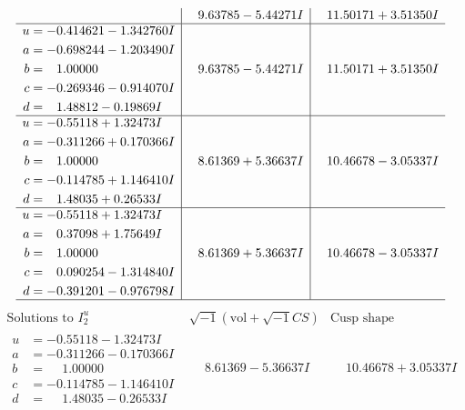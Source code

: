 \documentclass[1p]{elsarticle_modified}
\theoremstyle{definition}
\newcommand{\I}{\sqrt{-1}}
\begin{document}
$$\begin{array}{c|c|c}
 & \phantom{-}9.63785 - 5.44271 I & \phantom{-}11.50171 + 3.51350 I \\ \hline\begin{aligned}
u &= -0.414621 - 1.342760 I \\
a &= -0.698244 - 1.203490 I \\
b &= \phantom{-}1.00000\phantom{ +0.000000I} \\
c &= -0.269346 - 0.914070 I \\
d &= \phantom{-}1.48812 - 0.19869 I\end{aligned}
 & \phantom{-}9.63785 - 5.44271 I & \phantom{-}11.50171 + 3.51350 I \\ \hline\begin{aligned}
u &= -0.55118 + 1.32473 I \\
a &= -0.311266 + 0.170366 I \\
b &= \phantom{-}1.00000\phantom{ +0.000000I} \\
c &= -0.114785 + 1.146410 I \\
d &= \phantom{-}1.48035 + 0.26533 I\end{aligned}
 & \phantom{-}8.61369 + 5.36637 I & \phantom{-}10.46678 - 3.05337 I \\ \hline\begin{aligned}
u &= -0.55118 + 1.32473 I \\
a &= \phantom{-}0.37098 + 1.75649 I \\
b &= \phantom{-}1.00000\phantom{ +0.000000I} \\
c &= \phantom{-}0.090254 - 1.314840 I \\
d &= -0.391201 - 0.976798 I\end{aligned}
 & \phantom{-}8.61369 + 5.36637 I & \phantom{-}10.46678 - 3.05337 I\\
 \hline 
 \end{array}$$\newpage$$\begin{array}{c|c|c}  
\text{Solutions to }I^u_{2}& \I (\text{vol} + \sqrt{-1}CS) & \text{Cusp shape}\\
 \hline 
\begin{aligned}
u &= -0.55118 - 1.32473 I \\
a &= -0.311266 - 0.170366 I \\
b &= \phantom{-}1.00000\phantom{ +0.000000I} \\
c &= -0.114785 - 1.146410 I \\
d &= \phantom{-}1.48035 - 0.26533 I\end{aligned}
 & \phantom{-}8.61369 - 5.36637 I & \phantom{-}10.46678 + 3.05337 I \\ \hline\begin{aligned}

\end{aligned}
\end{array}$$
\end{document}
